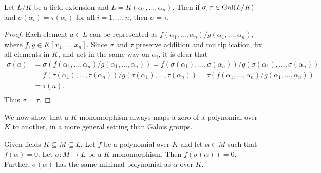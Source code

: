 \begin{theorem} \label{thm:galois-group-determined-by-generator}
	Let $L/K$ be a field extension and $L = K(\alpha_1, \ldots, \alpha_n)$. Then if $\sigma, \tau \in \operatorname{Gal}(L/K)$ and $\sigma(\alpha_i) = \tau(\alpha_i)$ for all $i = 1, \dots, n$, then $\sigma = \tau$. 
\end{theorem}

\begin{proof}
	Each element $a \in L$ can be represented as $ f(\alpha_1, \dots, \alpha_n) / g(\alpha_1, \dots, \alpha_n)$, where $f, g \in K[x_1, \ldots, x_n]$. Since $\sigma$ and $\tau$ preserve addition and multiplication, fix all elements in $K$, and act in the same way on $\alpha_i$, it is clear that
	\begin{equation*}
		\begin{split}
		\sigma(a) 
			&= \sigma(f(\alpha_1, \dots, \alpha_n) / g(\alpha_1, \dots, \alpha_n)) 
			= f(\sigma(\alpha_1), \dots, \sigma(\alpha_n)) / g(\sigma(\alpha_1), \dots, \sigma(\alpha_n)) \\
			&= f(\tau(\alpha_1), \dots, \tau(\alpha_n)) / g(\tau(\alpha_1), \dots, \tau(\alpha_n))  
			=  \tau(f(\alpha_1, \dots, \alpha_n) / g(\alpha_1, \dots, \alpha_n)) \\
			&= \tau(a).\\ 
		\end{split}
	\end{equation*}
Thus $\sigma = \tau$.
\end{proof}






We now show that a $K$-monomorphism always maps a zero of a polynomial over $K$ to another, in a more general setting than Galois groups. 

\begin{theorem} \label{thm:galois-group-permutes-zeros}
Given fields $K \subseteq M \subseteq L$. Let $f$ be a polynomial over $K$ and let $\alpha \in M$ such that $f(\alpha) = 0$. Let $\sigma : M \to L$ be a $K$-monomorphism. Then $f(\sigma(\alpha)) = 0$. Further, $\sigma(\alpha)$ has the same minimal polynomial as $\alpha$ over $K$. 

\end{theorem}

